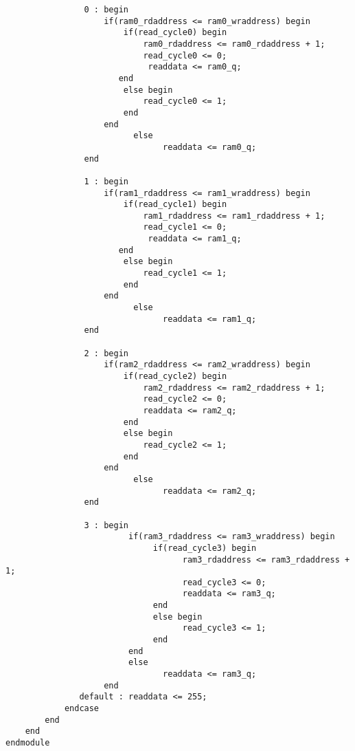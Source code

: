 \documentclass[twoside,12pt,fleqn]{book} %
\begin{document}
\begin{lstlisting}
                0 : begin
                    if(ram0_rdaddress <= ram0_wraddress) begin
                        if(read_cycle0) begin
                            ram0_rdaddress <= ram0_rdaddress + 1;
                            read_cycle0 <= 0;
                             readdata <= ram0_q;
                       end
                        else begin
                            read_cycle0 <= 1;
                        end
                    end
						  else
								readdata <= ram0_q;
                end
					 
                1 : begin
                    if(ram1_rdaddress <= ram1_wraddress) begin
                        if(read_cycle1) begin
                            ram1_rdaddress <= ram1_rdaddress + 1;
                            read_cycle1 <= 0;
                             readdata <= ram1_q;
                       end
                        else begin
                            read_cycle1 <= 1;
                        end
                    end
						  else
								readdata <= ram1_q;
                end

                2 : begin
                    if(ram2_rdaddress <= ram2_wraddress) begin
                        if(read_cycle2) begin
                            ram2_rdaddress <= ram2_rdaddress + 1;
                            read_cycle2 <= 0;
                            readdata <= ram2_q;
                        end
                        else begin
                            read_cycle2 <= 1;
                        end
                    end
						  else
								readdata <= ram2_q;
                end

                3 : begin
						 if(ram3_rdaddress <= ram3_wraddress) begin
							  if(read_cycle3) begin
									ram3_rdaddress <= ram3_rdaddress + 1;
									read_cycle3 <= 0;
									readdata <= ram3_q;
							  end
							  else begin
									read_cycle3 <= 1;
							  end
						 end
						 else
								readdata <= ram3_q;
					end
               default : readdata <= 255; 
            endcase
        end
    end
endmodule
\end{lstlisting}
\end{document}
